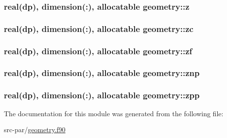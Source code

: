 \hypertarget{classgeometry_a567da85e335951f534f57b51765df56a}{
\subsubsection[{z}]{\setlength{\rightskip}{0pt plus 5cm}real(dp), dimension(\-:), allocatable geometry\-::z}}\label{classgeometry_a567da85e335951f534f57b51765df56a}
\hypertarget{classgeometry_accaf072ca71c8cf746b911dfc0165664}{
\subsubsection[{zc}]{\setlength{\rightskip}{0pt plus 5cm}real(dp), dimension(\-:), allocatable geometry\-::zc}}\label{classgeometry_accaf072ca71c8cf746b911dfc0165664}
\hypertarget{classgeometry_acf0149de3e29b6714898a4db86b62435}{
\subsubsection[{zf}]{\setlength{\rightskip}{0pt plus 5cm}real(dp), dimension(\-:), allocatable geometry\-::zf}}\label{classgeometry_acf0149de3e29b6714898a4db86b62435}
\hypertarget{classgeometry_a40f59df46474b424b2545f108ac317ec}{
\subsubsection[{znp}]{\setlength{\rightskip}{0pt plus 5cm}real(dp), dimension(\-:), allocatable geometry\-::znp}}\label{classgeometry_a40f59df46474b424b2545f108ac317ec}
\hypertarget{classgeometry_a55be35632eac8306e28a7d900e1c9cb1}{
\subsubsection[{zpp}]{\setlength{\rightskip}{0pt plus 5cm}real(dp), dimension(\-:), allocatable geometry\-::zpp}}\label{classgeometry_a55be35632eac8306e28a7d900e1c9cb1}


The documentation for this module was generated from the following file\-:\begin{DoxyCompactItemize}
\item 
src-\/par/\hyperlink{geometry_8f90}{geometry.\-f90}\end{DoxyCompactItemize}

